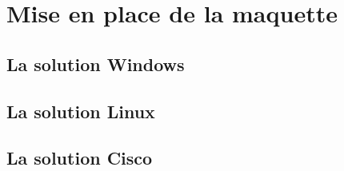 \section{Mise en place de la maquette}
\subsection{La solution Windows}

\subsection{La solution Linux}

\subsection{La solution Cisco}

\pagebreak